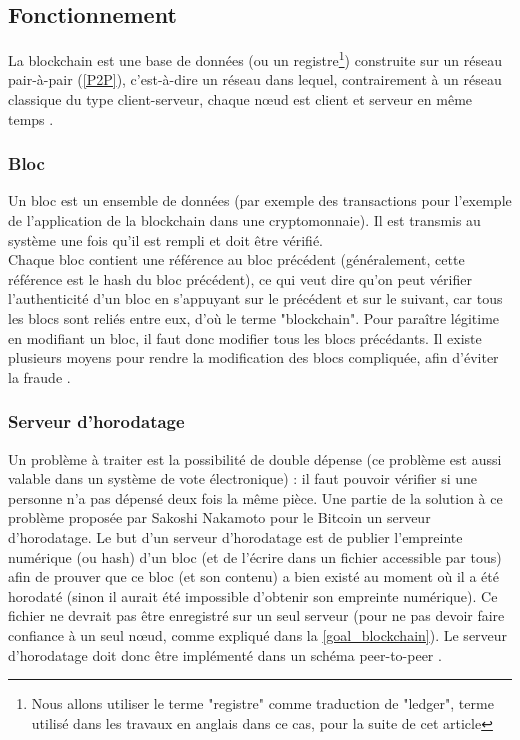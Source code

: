 \documentclass[10pt,a4paper,twoside]{article}
\numberwithin{equation}{section}
\begin{document}
			
	\subsection{Fonctionnement} \label{fonctionnement_blockchain}
		La blockchain est une base de données (ou un registre\footnote{Nous allons utiliser le terme "registre" comme traduction de "ledger", terme utilisé dans les travaux en anglais dans ce cas, pour la suite de cet article}) construite sur un réseau pair-à-pair (\autoref{P2P}), c'est-à-dire un réseau dans lequel, contrairement à un réseau classique du type client-serveur, chaque n\oe ud est client et serveur en même temps \cite{bitcoin} \cite{wiki:blockchain}.
		
		\subsubsection{Bloc} \label{bloc}
			Un bloc est un ensemble de données (par exemple des transactions pour l'exemple de l'application de la blockchain dans une cryptomonnaie). Il est transmis au système une fois qu'il est rempli et doit être vérifié.\\
			Chaque bloc contient une référence au bloc précédent (généralement, cette référence est le hash du bloc précédent), ce qui veut dire qu'on peut vérifier l'authenticité d'un bloc en s'appuyant sur le précédent et sur le suivant, car tous les blocs sont reliés entre eux, d'où le terme "blockchain". Pour paraître légitime en modifiant un bloc, il faut donc modifier tous les blocs précédants. Il existe plusieurs moyens pour rendre la modification des blocs compliquée, afin d'éviter la fraude \cite{bitcoin}. 
			
		
		\subsubsection{Serveur d'horodatage} \label{timestamp_server}
			Un problème à traiter est la possibilité de double dépense (ce problème est aussi valable dans un système de vote électronique) : il faut pouvoir vérifier si une personne n'a pas dépensé deux fois la même pièce. Une partie de la solution à ce problème proposée par Sakoshi Nakamoto pour le Bitcoin un serveur d'horodatage. Le but d'un serveur d'horodatage est de publier l'empreinte numérique (ou hash) d'un bloc (et de l'écrire dans un fichier accessible par tous) afin de prouver que ce bloc (et son contenu) a bien existé au moment où il a été horodaté (sinon il aurait été impossible d'obtenir son empreinte numérique). Ce fichier ne devrait pas être enregistré sur un seul serveur (pour ne pas devoir faire confiance à un seul n\oe ud, comme expliqué dans la \autoref{goal_blockchain}). Le serveur d'horodatage doit donc être implémenté dans un schéma peer-to-peer \cite{bitcoin}.
		
\end{document}
